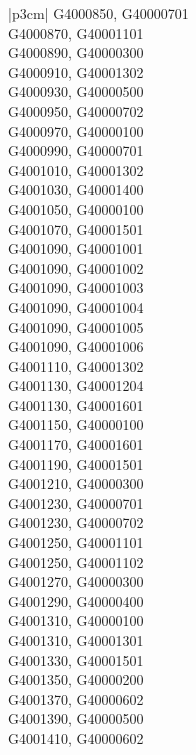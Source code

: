 \begin{customLongTable}{ |p{3cm}| }
G4000850, G40000701 \\ \hline
G4000870, G40001101 \\ \hline
G4000890, G40000300 \\ \hline
G4000910, G40001302 \\ \hline
G4000930, G40000500 \\ \hline
G4000950, G40000702 \\ \hline
G4000970, G40000100 \\ \hline
G4000990, G40000701 \\ \hline
G4001010, G40001302 \\ \hline
G4001030, G40001400 \\ \hline
G4001050, G40000100 \\ \hline
G4001070, G40001501 \\ \hline
G4001090, G40001001 \\ \hline
G4001090, G40001002 \\ \hline
G4001090, G40001003 \\ \hline
G4001090, G40001004 \\ \hline
G4001090, G40001005 \\ \hline
G4001090, G40001006 \\ \hline
G4001110, G40001302 \\ \hline
G4001130, G40001204 \\ \hline
G4001130, G40001601 \\ \hline
G4001150, G40000100 \\ \hline
G4001170, G40001601 \\ \hline
G4001190, G40001501 \\ \hline
G4001210, G40000300 \\ \hline
G4001230, G40000701 \\ \hline
G4001230, G40000702 \\ \hline
G4001250, G40001101 \\ \hline
G4001250, G40001102 \\ \hline
G4001270, G40000300 \\ \hline
G4001290, G40000400 \\ \hline
G4001310, G40000100 \\ \hline
G4001310, G40001301 \\ \hline
G4001330, G40001501 \\ \hline
G4001350, G40000200 \\ \hline
G4001370, G40000602 \\ \hline
G4001390, G40000500 \\ \hline
G4001410, G40000602 \\ \hline

\end{customLongTable}
